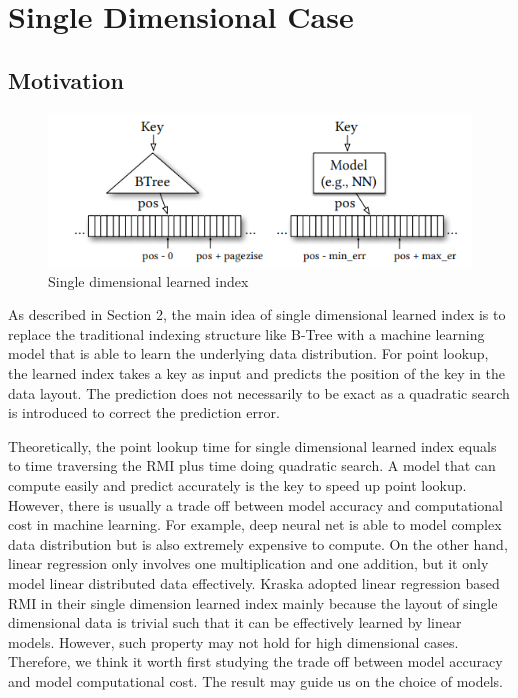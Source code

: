 \documentclass[sigconf,10pt]{acmart}
\begin{document}
\section{Single Dimensional Case}

\subsection{Motivation}

\begin{figure}[h]
  \includegraphics[scale=0.6]{../figures/single-dim-learned-index}
  \caption{Single dimensional learned index \cite{Learned_Index}}
  \label{singleDimensionalLearnedIndex}
\end{figure}

As described in Section 2, the main idea of single dimensional learned index is to replace
the traditional indexing structure like B-Tree with a machine learning model that is able
to learn the underlying data distribution. For point lookup, the learned index takes a key
as input and predicts the position of the key in the data layout. The prediction does not
necessarily to be exact as a quadratic search is introduced to correct the prediction error.

Theoretically, the point lookup time for single dimensional learned index equals to time
traversing the RMI plus time doing quadratic search. A model that can compute easily and predict
accurately is the key to speed up point lookup. However, there is usually a trade off between
model accuracy and computational cost in machine learning. For example, deep neural net is able
to model complex data distribution but is also extremely expensive to compute. On the other hand,
linear regression only involves one multiplication and one addition, but it only model linear
distributed data effectively. Kraska adopted linear regression based RMI in their single dimension
learned index mainly because the layout of single dimensional data is trivial such that it can be
effectively learned by linear models. However, such property may not hold for high dimensional cases.
Therefore, we think it worth first studying the trade off between model accuracy and model
computational cost. The result may guide us on the choice of models. 
\end{document}
